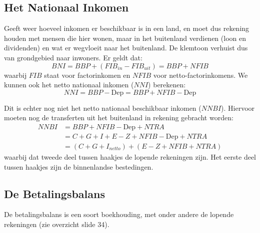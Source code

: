 \subsection{Het Nationaal Inkomen}
Geeft weer hoeveel inkomen er beschikbaar is in een land, en moet dus rekening houden met mensen die hier wonen, maar in het buitenland verdienen (loon en dividenden) en wat er wegvloeit naar het buitenland. De klemtoon verhuist dus van grondgebied naar inwoners. Er geldt dat:
\begin{equation}
    BNI = BBP + (FIB_{in} - FIB_{uit}) = BBP + NFIB
\end{equation}
waarbij $FIB$ staat voor factorinkomen en $NFIB$ voor netto-factorinkomens. We kunnen ook het netto nationaal inkomen ($NNI$) berekenen:
\begin{equation}
    NNI = BBP - \text{Dep} = BBP + NFIB - \text{Dep}
\end{equation}

Dit is echter nog niet het netto nationaal beschikbaar inkomen ($NNBI$). Hiervoor moeten nog de transferten uit het buitenland in rekening gebracht worden:
\begin{align*}
    NNBI &= BBP + NFIB - \text{Dep} + NTRA \\
        &= C + G + I + E - Z + NFIB - \text{Dep} + NTRA \\
        &= (C + G + I_{netto}) + (E - Z + NFIB + NTRA)
\end{align*}
waarbij dat tweede deel tussen haakjes de lopende rekeningen zijn. Het eerste deel tussen haakjes zijn de binnenlandse bestedingen.

\subsection{De Betalingsbalans}
De betalingsbalans is een soort boekhouding, met onder andere de lopende rekeningen (zie overzicht slide 34).
